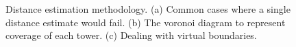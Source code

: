 \begin{figure}[h]
\centering
{}
\caption{Distance estimation methodology. 
(a) Common cases where a single distance estimate would fail.
(b) The voronoi diagram to represent coverage of each tower.
(c) Dealing with virtual boundaries.}
\end{figure}

